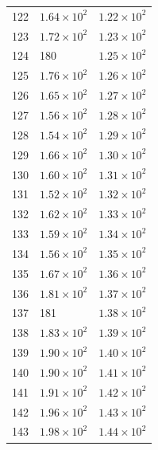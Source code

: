 \begin{table}[H]
\begin{tabular}{lll}
122 & $\displaystyle 1.64 \times 10^{2}$ & $\displaystyle 1.22 \times 10^{2}$ \\
123 & $\displaystyle 1.72 \times 10^{2}$ & $\displaystyle 1.23 \times 10^{2}$ \\
124 & 180 & $\displaystyle 1.25 \times 10^{2}$ \\
125 & $\displaystyle 1.76 \times 10^{2}$ & $\displaystyle 1.26 \times 10^{2}$ \\
126 & $\displaystyle 1.65 \times 10^{2}$ & $\displaystyle 1.27 \times 10^{2}$ \\
127 & $\displaystyle 1.56 \times 10^{2}$ & $\displaystyle 1.28 \times 10^{2}$ \\
128 & $\displaystyle 1.54 \times 10^{2}$ & $\displaystyle 1.29 \times 10^{2}$ \\
129 & $\displaystyle 1.66 \times 10^{2}$ & $\displaystyle 1.30 \times 10^{2}$ \\
130 & $\displaystyle 1.60 \times 10^{2}$ & $\displaystyle 1.31 \times 10^{2}$ \\
131 & $\displaystyle 1.52 \times 10^{2}$ & $\displaystyle 1.32 \times 10^{2}$ \\
132 & $\displaystyle 1.62 \times 10^{2}$ & $\displaystyle 1.33 \times 10^{2}$ \\
133 & $\displaystyle 1.59 \times 10^{2}$ & $\displaystyle 1.34 \times 10^{2}$ \\
134 & $\displaystyle 1.56 \times 10^{2}$ & $\displaystyle 1.35 \times 10^{2}$ \\
135 & $\displaystyle 1.67 \times 10^{2}$ & $\displaystyle 1.36 \times 10^{2}$ \\
136 & $\displaystyle 1.81 \times 10^{2}$ & $\displaystyle 1.37 \times 10^{2}$ \\
137 & 181 & $\displaystyle 1.38 \times 10^{2}$ \\
138 & $\displaystyle 1.83 \times 10^{2}$ & $\displaystyle 1.39 \times 10^{2}$ \\
139 & $\displaystyle 1.90 \times 10^{2}$ & $\displaystyle 1.40 \times 10^{2}$ \\
140 & $\displaystyle 1.90 \times 10^{2}$ & $\displaystyle 1.41 \times 10^{2}$ \\
141 & $\displaystyle 1.91 \times 10^{2}$ & $\displaystyle 1.42 \times 10^{2}$ \\
142 & $\displaystyle 1.96 \times 10^{2}$ & $\displaystyle 1.43 \times 10^{2}$ \\
143 & $\displaystyle 1.98 \times 10^{2}$ & $\displaystyle 1.44 \times 10^{2}$ \\

\end{tabular}
\end{table}
